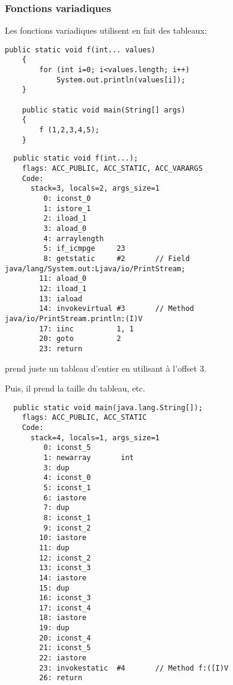 \subsubsection{Fonctions variadiques}

Les fonctions variadiques utilisent en fait des tableaux:

\begin{lstlisting}[style=customjava]
	public static void f(int... values)
	{
		for (int i=0; i<values.length; i++)
			System.out.println(values[i]);
	}

	public static void main(String[] args) 
	{
		f (1,2,3,4,5);
	}
\end{lstlisting}

\begin{lstlisting}
  public static void f(int...);
    flags: ACC_PUBLIC, ACC_STATIC, ACC_VARARGS
    Code:
      stack=3, locals=2, args_size=1
         0: iconst_0      
         1: istore_1      
         2: iload_1       
         3: aload_0       
         4: arraylength   
         5: if_icmpge     23
         8: getstatic     #2       // Field java/lang/System.out:Ljava/io/PrintStream;
        11: aload_0       
        12: iload_1       
        13: iaload        
        14: invokevirtual #3       // Method java/io/PrintStream.println:(I)V
        17: iinc          1, 1
        20: goto          2
        23: return        
\end{lstlisting}

\ttf prend juste un tableau d'entier en utilisant  à l'offset 3.

Puis, il prend la taille du tableau, etc.

\begin{lstlisting}
  public static void main(java.lang.String[]);
    flags: ACC_PUBLIC, ACC_STATIC
    Code:
      stack=4, locals=1, args_size=1
         0: iconst_5      
         1: newarray       int
         3: dup           
         4: iconst_0      
         5: iconst_1      
         6: iastore       
         7: dup           
         8: iconst_1      
         9: iconst_2      
        10: iastore       
        11: dup           
        12: iconst_2      
        13: iconst_3      
        14: iastore       
        15: dup           
        16: iconst_3      
        17: iconst_4      
        18: iastore       
        19: dup           
        20: iconst_4      
        21: iconst_5      
        22: iastore       
        23: invokestatic  #4       // Method f:([I)V
        26: return        
\end{lstlisting}

